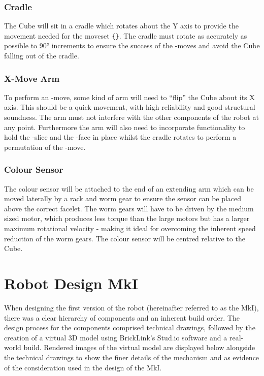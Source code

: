 \documentclass{report}
\newcommand{\moveset}[1]{\uppercase{\texttt{\{\formatmoves{#1}\}}}}
\newcommand{\face}[1]{\uppercase{\texttt{\formatmovesnospace{#1}}}-face}
\newcommand{\move}[1]{\uppercase{\texttt{\formatmovesnospace{#1}}}-move}
\newcommand{\slice}[1]{\uppercase{\texttt{\formatmovesnospace{#1}}}-slice}
\begin{document}
    \subsubsection{Cradle}
    
    The Cube will sit in a cradle which rotates about the Y axis to provide the movement needed for the moveset \moveset{Y.Y'y2D.D'd"}. The cradle must rotate as accurately as possible to \ang{90} increments to ensure the success of the \move{x}s and avoid the Cube falling out of the cradle. 
    
    \subsubsection{X-Move Arm}
    To perform an \move{x}, some kind of arm will need to \enquote{flip} the Cube about its X axis. This should be a quick movement, with high reliability and good structural soundness. The arm must not interfere with the other components of the robot at any point. Furthermore the arm will also need to incorporate functionality to hold the \slice{l-r} and the \face{u} in place whilst the cradle rotates to perform a permutation of the \move{d}.
    
    \subsubsection{Colour Sensor}
    The colour sensor will be attached to the end of an extending arm which can be moved laterally by a rack and worm gear to ensure the sensor can be placed above the correct facelet. The worm gears will have to be driven by the medium sized motor, which produces less torque than the large motors but has a larger maximum rotational velocity - making it ideal for overcoming the inherent speed reduction of the worm gears. The colour sensor will be centred relative to the Cube.
    
    \section{Robot Design MkI}
    
	When designing the first version of the robot (hereinafter referred to as the MkI), there was a clear hierarchy of components and an inherent build order. The design process for the components comprised technical drawings, followed by the creation of a virtual 3D model using BrickLink's Stud.io software \cite{BrickLink2016} and a real-world build. Rendered images of the virtual model are displayed below alongside the technical drawings to show the finer details of the mechanism and as evidence of the consideration used in the design of the MkI.
    
\end{document}
